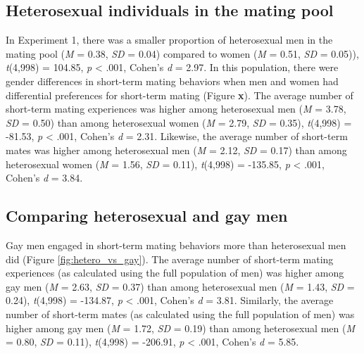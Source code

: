 \documentclass[
  11pt,
]{article}
\begin{document}
\hypertarget{heterosexual-individuals-in-the-mating-pool}{%
\subsection{Heterosexual individuals in the mating
pool}\label{heterosexual-individuals-in-the-mating-pool}}

In Experiment 1, there was a smaller proportion of heterosexual men in
the mating pool (\emph{M} = 0.38, \emph{SD} = 0.04) compared to women
(\emph{M} = 0.51, \emph{SD} = 0.05)), \emph{t}(4,998) = 104.85, \emph{p}
\textless{} .001, Cohen's \emph{d} = 2.97. In this population, there
were gender differences in short-term mating behaviors when men and
women had differential preferences for short-term mating (Figure
\textbf{x}). The average number of short-term mating experiences was
higher among heterosexual men (\emph{M} = 3.78, \emph{SD} = 0.50) than
among heterosexual women (\emph{M} = 2.79, \emph{SD} = 0.35),
\emph{t}(4,998) = -81.53, \emph{p} \textless{} .001, Cohen's \emph{d} =
2.31. Likewise, the average number of short-term mates was higher among
heterosexual men (\emph{M} = 2.12, \emph{SD} = 0.17) than among
heterosexual women (\emph{M} = 1.56, \emph{SD} = 0.11), \emph{t}(4,998)
= -135.85, \emph{p} \textless{} .001, Cohen's \emph{d} = 3.84.

\hypertarget{comparing-heterosexual-and-gay-men}{%
\subsection{Comparing heterosexual and gay
men}\label{comparing-heterosexual-and-gay-men}}

Gay men engaged in short-term mating behaviors more than heterosexual
men did (Figure \ref{fig:hetero_vs_gay}). The average number of
short-term mating experiences (as calculated using the full population
of men) was higher among gay men (\emph{M} = 2.63, \emph{SD} = 0.37)
than among heterosexual men (\emph{M} = 1.43, \emph{SD} = 0.24),
\emph{t}(4,998) = -134.87, \emph{p} \textless{} .001, Cohen's \emph{d} =
3.81. Similarly, the average number of short-term mates (as calculated
using the full population of men) was higher among gay men (\emph{M} =
1.72, \emph{SD} = 0.19) than among heterosexual men (\emph{M} = 0.80,
\emph{SD} = 0.11), \emph{t}(4,998) = -206.91, \emph{p} \textless{} .001,
Cohen's \emph{d} = 5.85.
\end{document}
